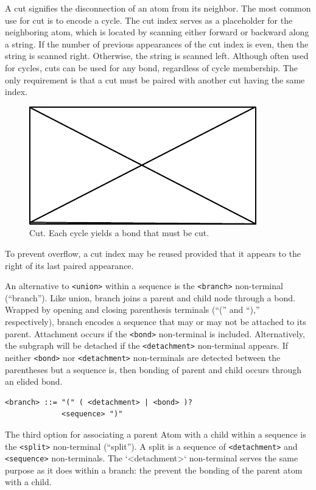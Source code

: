 \documentclass{article}
\def\ttt{\texttt}
\begin{document}
A cut signifies the disconnection of an atom from its neighbor. The most common use for cut is to encode a cycle. The cut index serves as a placeholder for the neighboring atom, which is located by scanning either forward or backward along a string. If the number of previous appearances of the cut index is even, then the string is scanned right. Otherwise, the string is scanned left. Although often used for cycles, cuts can be used for any bond, regardless of cycle membership. The only requirement is that a cut must be paired with another cut having the same index.

\begin{figure}
    \centering
    \includegraphics{filler}
    \caption{Cut. Each cycle yields a bond that must be cut.}
    \label{fig:cut}
\end{figure}

To prevent overflow, a cut index may be reused provided that it appears to the right of its last paired appearance.

An alternative to \ttt{<union>} within a sequence is the \ttt{<branch>} non-terminal (\enquote{branch}). Like union, branch joins a parent and child node through a bond. Wrapped by opening and closing parenthesis terminals (\enquote{(} and \enquote{),} respectively), branch encodes a sequence that may or may not be attached to its parent. Attachment occurs if the \ttt{<bond>} non-terminal is included. Alternatively, the subgraph will be detached if the \ttt{<detachment>} non-terminal appears. If neither \ttt{<bond>} nor \ttt{<detachment>} non-terminals are detected between the parentheses but a sequence is, then bonding of parent and child occurs through an elided bond.

\begin{lstlisting}
<branch> ::= "(" ( <detachment> | <bond> )?
             <sequence> ")"
\end{lstlisting}

The third option for associating a parent Atom with a child within a sequence is the \ttt{<split>} non-terminal (\enquote{split}). A split is a sequence of \ttt{<detachment>} and \ttt{<sequence>} non-terminals. The `<detachment>` non-terminal serves the same purpose as it does within a branch: the prevent the bonding of the parent atom with a child.
\end{document}
